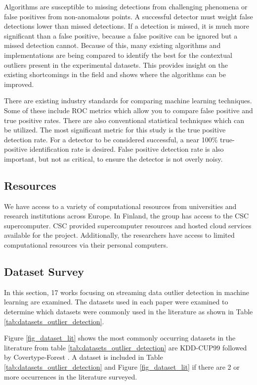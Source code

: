 Algorithms are susceptible to missing detections from challenging phenomena or false positives from non-anomalous points.
A successful detector must weight false detections lower than missed detections.
If a detection is missed, it is much more significant than a false positive, because a false positive can be ignored but a missed detection cannot.
Because of this, many existing algorithms and implementations are being compared to identify the best for the contextual outliers present in the experimental datasets.
This provides insight on the existing shortcomings in the field and shows where the algorithms can be improved.

There are existing industry standards for comparing machine learning techniques.
Some of these include ROC metrics which allow you to compare false positive and true positive rates.
There are also conventional statistical techniques which can be utilized.
The most significant metric for this study is the true positive detection rate.
For a detector to be considered successful, a near 100\% true-positive identification rate is desired.
False positive detection rate is also important, but not as critical, to ensure the detector is not overly noisy.

\subsection{Resources}

We have access to a variety of computational resources from universities and research institutions across Europe.
In Finland, the group has access to the CSC supercomputer.
CSC provided supercomputer resources and hosted cloud services available for the project.
Additionally, the researchers have access to limited computational resources via their personal computers.

\subsection{Dataset Survey}
\label{ref_dataset_survey}

In this section, 17 works focusing on streaming data outlier detection in machine learning are examined.
The datasets used in each paper were examined to determine which datasets were commonly used in the literature as shown in Table \ref{tab:datasets_outlier_detection}.

\newpage


Figure \ref{fig_dataset_lit} shows the most commonly occurring datasets in the literature from table \ref{tab:datasets_outlier_detection} are KDD-CUP99 \parencite{kdd1999} followed by Covertype-Forest \parencite{covertype-dataset}.
A dataset is included in Table \ref{tab:datasets_outlier_detection} and Figure \ref{fig_dataset_lit} if there are 2 or more occurrences in the literature surveyed.

